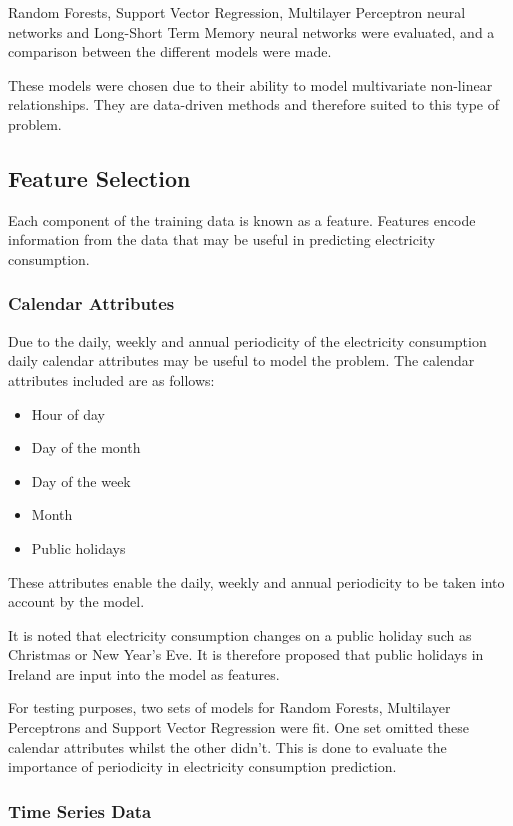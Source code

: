 Random Forests, Support Vector Regression, Multilayer Perceptron neural networks and Long-Short Term Memory neural networks were evaluated, and a comparison between the different models were made. 

These models were chosen due to their ability to model multivariate non-linear relationships. They are data-driven methods and therefore suited to this type of problem.

\subsection{Feature Selection}

Each component of the training data is known as a feature. Features encode information from the data that may be useful in predicting electricity consumption. 

\subsubsection{Calendar Attributes}

Due to the daily, weekly and annual periodicity of the electricity consumption daily calendar attributes may be useful to model the problem. The calendar attributes included are as follows:

\begin{itemize}
	\item Hour of day
	\item Day of the month
	\item Day of the week
	\item Month
	\item Public holidays
\end{itemize}

These attributes enable the daily, weekly and annual periodicity to be taken into account by the model.

It is noted that electricity consumption changes on a public holiday such as Christmas or New Year's Eve. It is therefore proposed that public holidays in Ireland are input into the model as features. 

For testing purposes, two sets of models for Random Forests, Multilayer Perceptrons and Support Vector Regression were fit. One set omitted these calendar attributes whilst the other didn't. This is done to evaluate the importance of periodicity in electricity consumption prediction.

\subsubsection{Time Series Data}

